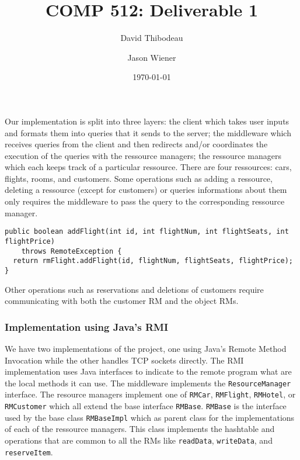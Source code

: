 \documentclass[12pt]{article}
\author{David Thibodeau \and Jason Wiener}
\title{COMP 512: Deliverable 1}
\date{\today}
\theoremstyle{plain}%
\theoremstyle{definition}
\theoremstyle{remark}
\newcommand{\java}[1]{{\lstinline!#1!}}
\begin{document}
\maketitle

Our implementation is split into three layers: the client which takes
user inputs and formats them into queries that it sends to the server;
the middleware which receives queries from the client and then redirects and/or
coordinates the execution of the queries with the ressource managers;
the ressource managers which each keeps track of a particular
ressource. There are four ressources: cars, flights, rooms, and
customers. Some operations such as adding a ressource, deleting a
ressource (except for customers) or queries informations about them
only requires the middleware to pass the query to the corresponding
ressource manager. 
\begin{lstlisting}
public boolean addFlight(int id, int flightNum, int flightSeats, int flightPrice) 
    throws RemoteException {
  return rmFlight.addFlight(id, flightNum, flightSeats, flightPrice);
}
\end{lstlisting}
Other operations such as reservations and deletions
of customers require communicating with both the
customer RM and the object RMs.

\subsubsection*{Implementation using Java's RMI}
We have two implementations of the project, one using Java's Remote
Method Invocation while the other handles TCP sockets directly. The
RMI implementation uses Java interfaces to indicate to the remote
program what are the local methods it can use. The middleware
implements the \java{ResourceManager} interface. The resource managers
implement one of \java{RMCar}, \java{RMFlight}, \java{RMHotel}, or
\java{RMCustomer} which all extend the base interface \java{RMBase}.
\java{RMBase} is the interface used by the base class
\java{RMBaseImpl} which as parent class for the implementations of
each of the ressource managers. This class implements the hashtable
and operations that are common to all the RMs like \java{readData},
\java{writeData}, and \java{reserveItem}.
\end{document}
